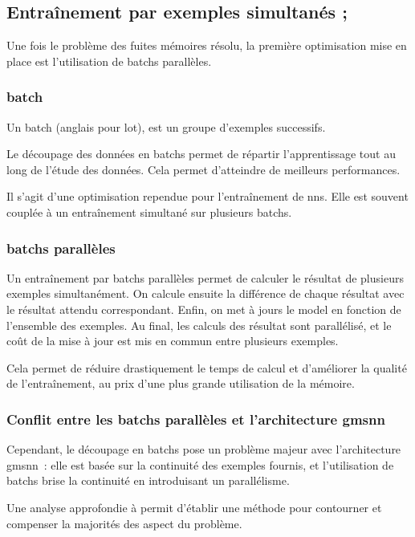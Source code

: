 \subsection{Entraînement par exemples simultanés ; } \label{subsec:optibatch}
Une fois le problème des fuites mémoires résolu, la première optimisation mise en place est l'utilisation de \glspl{batch} parallèles.

\subsubsection{\gls{batch}}
Un \gls{batch} (anglais pour lot), est un groupe d'exemples successifs.

Le découpage des données en \glspl{batch} permet de répartir l'apprentissage tout au long de l'étude des données.
Cela permet d'atteindre de meilleurs performances.

Il s'agit d'une optimisation rependue pour l'entraînement de \glspl{nn}. %
Elle est souvent couplée à un entraînement simultané sur plusieurs \glspl{batch}.

\subsubsection{\Glspl{batch} parallèles}
Un entraînement par \glspl{batch} parallèles permet de calculer le résultat de plusieurs exemples simultanément.
On calcule ensuite la différence de chaque résultat avec le résultat attendu correspondant.
Enfin, on met à jours le \gls{model} en fonction de l'ensemble des exemples.
Au final, les calculs des résultat sont parallélisé, et le coût de la mise à jour est mis en commun entre plusieurs exemples.

Cela permet de réduire drastiquement le temps de calcul et d'améliorer la qualité de l'entraînement, au prix d'une plus grande utilisation de la mémoire.

\subsubsection{Conflit entre les \glspl{batch} parallèles et l'architecture \gls{gmsnn}}
Cependant, le découpage en \glspl{batch} pose un problème majeur avec l'architecture \gls{gmsnn}~: elle est basée sur la continuité des exemples fournis, et l'utilisation de \glspl{batch} brise la continuité en introduisant un parallélisme.

Une analyse approfondie à permit d'établir une méthode pour contourner et compenser la majorités des aspect du problème.

